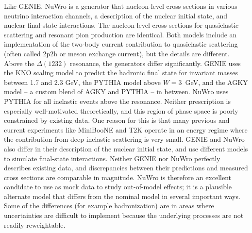 \documentclass[11pt]{article}
\begin{document}
Like GENIE, NuWro is a generator that nucleon-level cross sections in various neutrino interaction channels, a description of the nuclear initial state, and nuclear final-state interactions. The nucleon-level cross sections for quasielastic scattering and resonant pion production are identical. Both models include an implementation of the two-body current contribution to quasielastic scattering (often called 2p2h or meson exchange current), but the details are different. Above the $\Delta(1232)$ resonance, the generators differ significantly. GENIE uses the KNO scaling model to predict the hadronic final state for invariant masses between 1.7 and 2.3 GeV, the PYTHIA model above $W = 3$~GeV, and the AGKY model -- a custom blend of AGKY and PYTHIA -- in between. NuWro uses PYTHIA for all inelastic events above the resonance. Neither prescription is especially well-motivated theoretically, and this region of phase space is poorly constrained by existing data. One reason for this is that many previous and current experiments like MiniBooNE and T2K operate in an energy regime where the contribution from deep inelastic scattering is very small. GENIE and NuWro also differ in their description of the nuclear initial state, and use different models to simulate final-state interactions. Neither GENIE nor NuWro perfectly describes existing data, and discrepancies between their predictions and measured cross sections are comparable in magnitude. NuWro is therefore an excellent candidate to use as mock data to study out-of-model effects; it is a plausible alternate model that differs from the nominal model in several important ways. Some of the differences (for example hadronization) are in areas where uncertainties are difficult to implement because the underlying processes are not readily reweightable.
\end{document}

